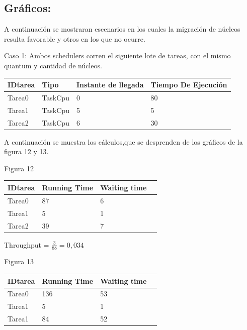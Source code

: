 \documentclass[10pt, a4paper]{article}
\begin{document}
\subsection{Gráficos:}
A continuación se mostraran escenarios en los cuales la migración de núcleos resulta favorable y otros en los que no ocurre.

Caso 1: Ambos schedulers corren el siguiente lote de tareas, con el mismo quantum y cantidad de núcleos.

\begin{center}
\begin{tabular}{| l | l | l | l |}
    \hline
    IDtarea &  Tipo & Instante de llegada& Tiempo De Ejecución\\ \hline
    Tarea0 & 	TaskCpu & 0&80 \\ \hline
    Tarea1 &	TaskCpu & 5&5 \\ \hline
    Tarea2 &	TaskCpu & 6&30 \\ \hline
   
\end{tabular}
\end{center}

A continuación se muestra los cálculos,que se desprenden de los gráficos de la figura 12 y 13.

\begin{center}
Figura 12
\end{center}

\begin{center}
\begin{tabular}{| l | l | l | l |}
    \hline
    IDtarea &  Running Time & Waiting time\\ \hline
    Tarea0 & 	87 & 6  \\ \hline
    Tarea1 & 	5 & 1 \\ \hline
    Tarea2 &	39 & 7 \\ \hline
    
   
\end{tabular}
\end{center}
\begin{center}
Throughput = $\frac{3}{88} = 0,034$
\end{center}
\begin{center}
Figura 13
\end{center}

\begin{center}
\begin{tabular}{| l | l | l | l |}
    \hline
    IDtarea &  Running Time & Waiting time \\ \hline
    Tarea0 & 	 136 & 53 \\ \hline
    Tarea1 & 	5 & 1 \\ \hline
    Tarea1 &	84 & 52 \\ \hline
   
\end{tabular}
\end{center}
\end{document}
